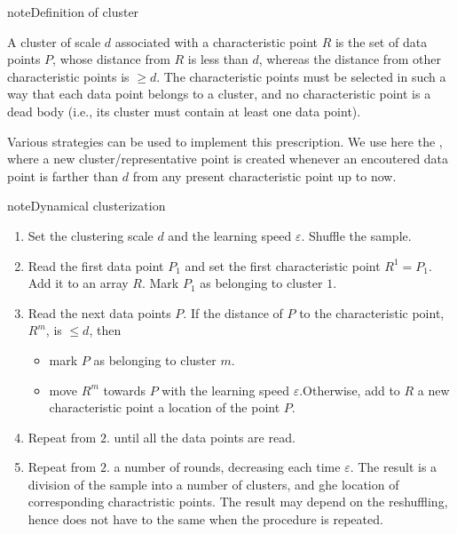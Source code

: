 \documentclass[letterpaper,10pt,english]{jupyterBook}
\begin{document}
\begin{sphinxadmonition}{note}{Definition of cluster}

\sphinxAtStartPar
A cluster of scale \(d\) associated with a characteristic point \(R\) is the set of data points \(P\), whose distance from \(R\) is less than \(d\), whereas the distance from other characteristic points is \(\ge d\). The characteristic points must be selected in such a way that each data point belongs to a cluster, and no characteristic point is a dead body (i.e., its cluster must contain at least one data point).
\end{sphinxadmonition}

\sphinxAtStartPar
Various strategies can be used to implement this prescription. We use here the , where a new cluster/representative point is created whenever an encoutered data point is farther than \(d\) from any present characteristic point up to now.

\begin{sphinxadmonition}{note}{Dynamical clusterization}
\begin{enumerate}
%
\item {} 
\sphinxAtStartPar
Set the clustering scale \(d\) and the learning speed \(\varepsilon\). Shuffle the sample.

\item {} 
\sphinxAtStartPar
Read the first data point \(P_1\) and set the first characteristic point \(R^1=P_1\). Add it to an array \(R\). Mark \(P_1\) as belonging to cluster \(1\).

\item {} 
\sphinxAtStartPar
Read the next data points \(P\). If the distance of \(P\) to the  characteristic point, \(R^m\), is \(\le d\), then
\begin{itemize}
\item {} 
\sphinxAtStartPar
mark \(P\) as belonging to cluster \(m\).

\item {} 
\sphinxAtStartPar
move \(R^m\) towards \(P\) with the learning speed \(\varepsilon\).Otherwise, add to \(R\) a new characteristic point a location of the point \(P\).

\end{itemize}

\item {} 
\sphinxAtStartPar
Repeat from \(2.\) until all the data points are read.

\item {} 
\sphinxAtStartPar
Repeat from \(2.\) a number of rounds, decreasing each time \(\varepsilon\). The result is a division of the sample into a number of clusters, and ghe location of corresponding charactristic points. The result may depend on the reshuffling, hence does not have to the same when the procedure is repeated.

\end{enumerate}
\end{sphinxadmonition}
\end{document}
